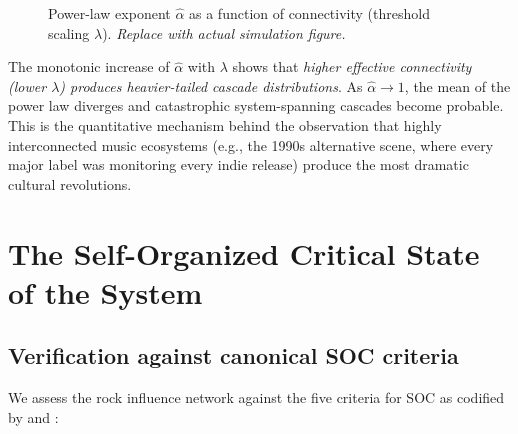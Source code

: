 \documentclass[12pt, a4paper]{article}
\begin{document}
\begin{figure}[H]
\centering
{}
\caption{Power-law exponent $\hat\alpha$ as a function of
  connectivity (threshold scaling $\lambda$).
  \textit{Replace with actual simulation figure.}}
\label{fig:sweep}
\end{figure}

The monotonic increase of $\hat\alpha$ with $\lambda$ shows
that \textit{higher effective connectivity (lower $\lambda$)
produces heavier-tailed cascade distributions}.
As $\hat\alpha\to 1$, the mean of the power law diverges
and catastrophic system-spanning cascades become probable.
This is the quantitative mechanism behind the observation
that highly interconnected music ecosystems (e.g., the
1990s alternative scene, where every major label was
monitoring every indie release) produce the most dramatic
cultural revolutions.


\section{The Self-Organized Critical State of the System}
\label{sec:socstate}

\subsection{Verification against canonical SOC criteria}

We assess the rock influence network against the five criteria
for SOC as codified by \citet{bak1996} and \citet{jensen1998}:
\end{document}
